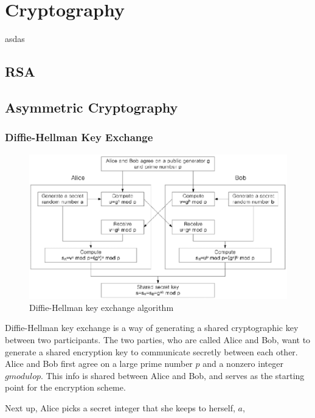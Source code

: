 \chapter{Cryptography}
\label{Cryptography}

asdas

\section{RSA}

\section{Asymmetric Cryptography}
\subsection{Diffie-Hellman Key Exchange}

\begin{figure}
	\includegraphics[width=\textwidth]{pictures/diffiehellman.eps}
	\caption{Diffie-Hellman key exchange algorithm\cite{Jeon2014-ag}}
	\label{Diagram, Diffie-Hellman Key Exchange}
\end{figure}
						
Diffie-Hellman key exchange is a way of generating a shared cryptographic key between two participants. The two parties, who are called Alice and Bob, want to generate a shared encryption key to communicate secretly between each other. Alice and Bob first agree on a large prime number \(p\) and a nonzero integer \(g modulo p\). This info is shared between Alice and Bob, and serves as the starting point for the encryption scheme.
						
Next up, Alice picks a secret integer that she keeps to herself, \(a\), 
						

